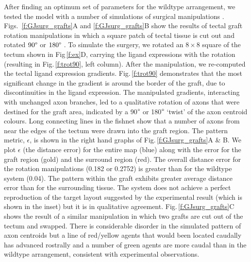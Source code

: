 \documentclass[9pt,lineno,draft]{elife}
\begin{document}
After finding an optimum set of parameters for the wildtype arrangement, we
tested the model with a number of simulations of surgical manipulations
.
Figs.~\ref{f:GJsurg_grafts}A and \ref{f:GJsurg_grafts}B show the results of tectal graft rotation manipulations in which a square patch of tectal tissue is cut out and rotated $90\degree$ or $180\degree$ \citep{chung_observations_1978}.
%
To simulate the surgery, we rotated an $8\times8$ square of the tectum shown in Fig\,\ref{f:ex}D, carrying the ligand expressions with the rotation (resulting in Fig.\,\ref{f:trot90}, left column).
After the manipulation, we re-computed the tectal ligand expression gradients. Fig.\,\ref{f:trot90} demonstrates that the most significant change in the gradient is around the border of the graft, due to discontinuities in the ligand expression.
The manipulated gradients, interacting with unchanged axon branches, led to a qualitative rotation of axons that were destined for the graft area, indicated by a 90$\degree$ or 180$\degree$ `twist' of the axon centroid colours.
Long connecting lines in the fishnet show that a number of axons from near the edges of the tectum were drawn into the graft region.
The pattern metric, $\epsilon$, is shown in the right hand graphs of Fig.\,\ref{f:GJsurg_grafts}A \& B.
We plot $\epsilon$ (the distance error) for the entire map (blue) along with the error for the graft region (gold) and the surround region (red).
The overall distance error for the rotation manipulations (0.182 or 0.2752)  is greater than for the wildtype system (0.04).
The pattern within the graft exhibits greater average distance error than for the surrounding tissue.
The system does not achieve a perfect reproduction of the target layout suggested by the experimental result (which is shown in the inset) but it is in qualitative agreement.
%
Fig.\,\ref{f:GJsurg_grafts}C shows the result of a similar manipulation in which two grafts are cut out of the tectum and swapped.
There is considerable disorder in the simulated pattern of axon centroids but a line of red/yellow agents that would been located caudally has advanced rostrally and a number of green agents are more caudal than in the wildtype arrangement, consistent with experimental observations.
\end{document}
